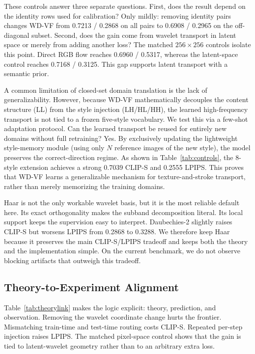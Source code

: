 \documentclass[letterpaper]{article}
\begin{document}
These controls answer three separate questions.
First, does the result depend on the identity rows used for calibration?
Only mildly: removing identity pairs changes WD-VF from 0.7213 / 0.2868 on all pairs to 0.6908 / 0.2965 on the off-diagonal subset.
Second, does the gain come from wavelet transport in latent space or merely from adding another loss?
The matched $256\times256$ controls isolate this point.
Direct RGB flow reaches 0.6960 / 0.5317, whereas the latent-space control reaches 0.7168 / 0.3125.
This gap supports latent transport with a semantic prior.

A common limitation of closed-set domain translation is the lack of generalizability. However, because WD-VF mathematically decouples the content structure (LL) from the style injection (LH/HL/HH), the learned high-frequency transport is not tied to a frozen five-style vocabulary.
We test this via a few-shot adaptation protocol. Can the learned transport be reused for entirely new domains without full retraining? Yes. By exclusively updating the lightweight style-memory module (using only $N$ reference images of the new style), the model preserves the correct-direction regime. As shown in Table~\ref{tab:controls}, the 8-style extension achieves a strong 0.7039 CLIP-S and 0.2555 LPIPS. This proves that WD-VF learns a generalizable mechanism for texture-and-stroke transport, rather than merely memorizing the training domains.

Haar is not the only workable wavelet basis, but it is the most reliable default here.
Its exact orthogonality makes the subband decomposition literal.
Its local support keeps the supervision easy to interpret.
Daubechies-2 slightly raises CLIP-S but worsens LPIPS from 0.2868 to 0.3288.
We therefore keep Haar because it preserves the main CLIP-S/LPIPS tradeoff and keeps both the theory and the implementation simple.
On the current benchmark, we do not observe blocking artifacts that outweigh this tradeoff.

\subsection{Theory-to-Experiment Alignment}

Table~\ref{tab:theorylink} makes the logic explicit: theory, prediction, and observation.
Removing the wavelet coordinate change hurts the frontier.
Mismatching train-time and test-time routing costs CLIP-S.
Repeated per-step injection raises LPIPS.
The matched pixel-space control shows that the gain is tied to latent-wavelet geometry rather than to an arbitrary extra loss.
\end{document}
